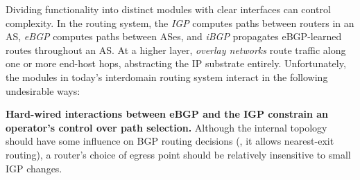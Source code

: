 Dividing functionality into distinct modules with clear interfaces can
control complexity.  In the routing system, the {\em IGP\/} computes
paths between routers in an AS, {\em eBGP\/} computes paths between ASes,
and {\em iBGP\/} propagates eBGP-learned routes throughout an
AS.  At a higher 
layer, {\em overlay networks\/} route traffic along one or more end-host
hops, abstracting the IP substrate entirely.
%
%
Unfortunately, the modules in today's
interdomain routing system interact in the following undesirable ways:

{\bf Hard-wired interactions between eBGP and the IGP constrain an
operator's control over path selection.}  Although the internal
topology should have some influence on BGP routing decisions (\eg, 
it allows nearest-exit routing), a
router's choice of egress point should be relatively insensitive to
small IGP changes.
%

